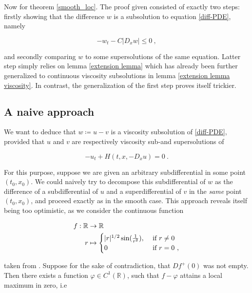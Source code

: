 	Now for theorem \ref{smooth_loc}. The proof given consisted of exactly two steps: firstly showing that the difference $ w $ is a subsolution to equation \ref{diff-PDE}, namely
	
	\begin{equation*}
		-w_t - C \lvert D_x w \rvert \leq 0 \ ,
	\end{equation*}
	
	and secondly comparing $ w $ to some supersolutions of the same equation. Latter step simply relies on lemma \ref{extension lemma} which has already been further generalized to continuous viscosity subsolutions in lemma \ref{extension lemma viscosity}. In contrast, the generalization of the first step proves itself trickier. 

	\subsection{A naive approach}
		\label{naive}
		
		We want to deduce that $ w \coloneqq u - v $ is a viscosity subsolution of \ref{diff-PDE}, provided that $ u $ and $ v $ are respectively viscosity sub-and supersolutions of
		
		\begin{equation*}
				-u_t + H(t, x, -D_x u) = 0 \ .
		\end{equation*}
		
		For this purpose, suppose we are given an arbitrary subdifferential in some point $ (t_0, x_0) $. We could naively try to decompose this subdifferential of $ w $ as the difference of a subdifferential of $ u $ and a superdifferential of $ v $ in the \emph{same} point $ (t_0, x_0) $, and proceed exactly as in the smooth case. This approach reveals itself being too optimistic, as we consider the continuous function
		
		\begin{align*}
			f : \mathbb{R} &\to \mathbb{R} \\
			r &\mapsto \begin{cases}
			\lvert r \rvert^{1/2} \sin(\frac{1}{r^2}), &\hbox{ if } r \neq 0 \\
			0 &\hbox{ if } r = 0  \ ,
			\end{cases}
		\end{align*}
		
		taken from \cite[p.~32, exercise 1.5]{bardi2008optimal}. Suppose for the sake of contradiction, that $ Df^{+}(0) $ was not empty. Then there exists a function $ \varphi \in C^1(\mathbb{R}) $, such that $ f - \varphi $ attains a local maximum in zero, i.e
		
